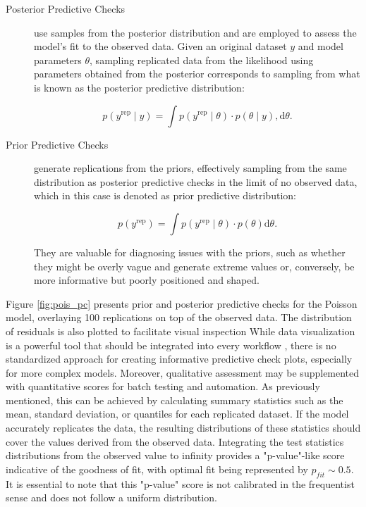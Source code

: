 \begin{description}
\item[Posterior Predictive Checks] use samples from the posterior distribution and are employed to assess the model's
  fit to the observed data. Given an original dataset $y$ and model parameters $\theta$, sampling replicated data from the likelihood
  using parameters obtained from the posterior corresponds to sampling
  from what is known as the posterior predictive distribution:

\begin{equation}
p(y^{\text{rep}}\mid y)=\int p(y^{\text{rep}}\mid\theta)\cdot p(\theta\mid y),\mathrm{d}\theta.
\label{eq:postpred}
\end{equation}

\item[Prior Predictive Checks] generate replications from the priors, effectively sampling from the same distribution
  as posterior predictive checks in the limit of no observed data, which in this case is denoted as prior predictive
  distribution:

\begin{equation}
p(y^{\text{rep}})=\int p(y^{\text{rep}}\mid\theta)\cdot p(\theta)\mathrm{d}\theta.
\label{eq:priorpred}
\end{equation}

  They are valuable for diagnosing issues with the priors, such as whether they might be overly vague and generate
  extreme values or, conversely, be more informative but poorly positioned and shaped.
\end{description}

Figure \ref{fig:pois_pc} presents prior and posterior predictive checks for the Poisson
model, overlaying 100 replications on top of the observed data. The distribution of residuals is also plotted to facilitate visual inspection
While data visualization is a powerful tool that should be integrated into every workflow \cite{gabry2019visualization}, there is no standardized
approach for creating informative predictive check plots, especially for more complex models. Moreover, qualitative assessment
may be supplemented with quantitative scores for batch testing and automation. As previously mentioned, this can be
achieved by calculating summary statistics such as the mean, standard deviation, or quantiles for each replicated
dataset. If the model accurately replicates the data, the resulting distributions of these statistics should cover
the values derived from the observed data. Integrating the test statistics distributions from the observed value to
infinity provides a "p-value"-like score indicative of the goodness of fit, with optimal fit being represented by $p_{fit}\sim 0.5$. It is essential to note that this "p-value" score is not calibrated in the frequentist sense and does not follow a uniform distribution.

